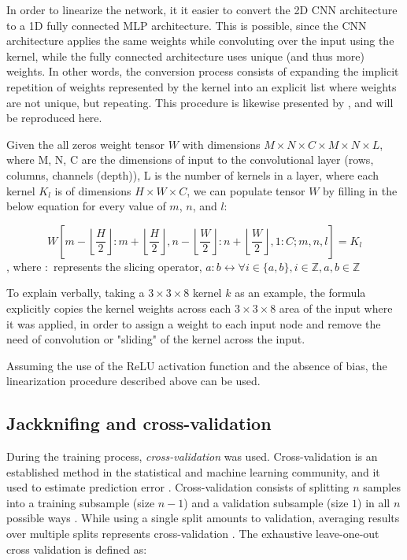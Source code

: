 In order to linearize the network, it it easier to convert the 2D CNN architecture to a 1D fully connected MLP architecture. This is possible, since the CNN architecture applies the same weights while convoluting over the input using the kernel, while the fully connected architecture uses unique (and thus more) weights. In other words, the conversion process consists of expanding the implicit repetition of weights represented by the kernel into an explicit list where weights are not unique, but repeating. This procedure is likewise presented by \textcite{keshishianEstimatingInterpretingNonlinear2020}, and will be reproduced here.

Given the all zeros weight tensor $W$ with dimensions $M \times N \times C \times M \times N \times L$, where M, N, C are the dimensions of input to the convolutional layer (rows, columns, channels (depth)), L is the number of kernels in a layer, where each kernel $K_l$ is of dimensions $H \times W \times C$, we can populate tensor $W$ by filling in the below equation for every value of $m$, $n$, and $l$:

\begin{equation}
	W\left[m - \left\lfloor\frac{H}{2}\right\rfloor:m+ \left\lfloor\frac{H}{2}\right\rfloor, n- \left\lfloor\frac{W}{2}\right\rfloor:n+ \left\lfloor\frac{W}{2}\right\rfloor, 1:C; m, n, l\right] = K_l
\end{equation} 
\noindent , where $:$ represents the slicing operator, $a:b \leftrightarrow \forall i \in \{a, b\}, i \in \mathbb{Z}, a, b \in \mathbb{Z}$

To explain verbally, taking a $3 \times 3 \times 8$ kernel $k$ as an example, the formula explicitly copies the kernel weights across each $3 \times 3 \times 8$ area of the input where it was applied, in order to assign a weight to each input node and remove the need of convolution or "sliding" of the kernel across the input.

Assuming the use of the ReLU activation function and the absence of bias, the linearization procedure described above can be used.

\subsection{Jackknifing and cross-validation}
During the training process, \emph{cross-validation} was used. Cross-validation is an established method in the statistical and machine learning community, and it used to estimate prediction error \parencite{batesCrossValidationWhatDoes2024}. Cross-validation consists of splitting $n$ samples  into a training subsample (size $n-1$) and a validation subsample (size $1$) in all $n$ possible ways \parencite{stoneCrossValidatoryChoiceAssessment1974}.  While using a single split amounts to validation, averaging results over multiple splits represents cross-validation \parencite{arlotSurveyCrossvalidationProcedures2010}. The exhaustive leave-one-out cross validation is defined as:

